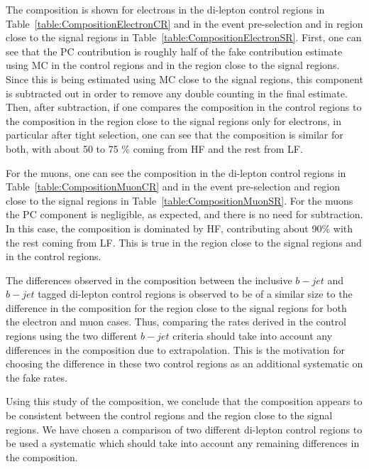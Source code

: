 The composition is shown for electrons in the di-lepton control 
regions in Table~\ref{table:CompositionElectronCR} and in the event pre-selection and in region close to the signal regions in Table~\ref{table:CompositionElectronSR}.
First, one can see that the PC contribution is roughly half of the fake contribution
estimate using MC
in the control regions and in the region close to the signal regions. Since this is being estimated
using MC close to the signal regions, 
this component is subtracted out in order to remove any double counting
in the final estimate. Then, after subtraction,
if one compares the composition in the control regions
to the composition in the region close to the signal regions only for electrons, 
in particular after tight selection, one can see that 
the composition is similar for both, 
with about 50 to 75 \% coming from HF and the rest from LF.

For the muons, one can see the composition in the di-lepton control regions in 
Table~\ref{table:CompositionMuonCR} and in the event pre-selection
and region close to the signal regions in Table~\ref{table:CompositionMuonSR}. For the muons the PC
component is negligible, as expected, and there is no need for subtraction.
In this case, the composition is dominated by HF, contributing about 90\% with the
rest coming from LF.  This is true in the region close to the signal regions and in the control regions.

The differences observed in the composition between the inclusive $b-jet$ and $b-jet$ 
tagged di-lepton control regions is observed to be of a similar size
to the difference in the composition for the region close to the signal regions for both the electron 
and muon cases.
Thus, comparing the rates derived in the control regions using the two different
$b-jet$ criteria should take into account any differences in the composition due
to extrapolation. This is the motivation for choosing the difference in these two 
control regions as an additional systematic on the fake rates.

Using this study of the composition, we conclude that the composition appears to be
consistent between the control regions and the region close to the signal regions.  We have chosen 
a comparison of two different di-lepton control regions to be used a systematic
which should take into account any remaining differences in the composition.

